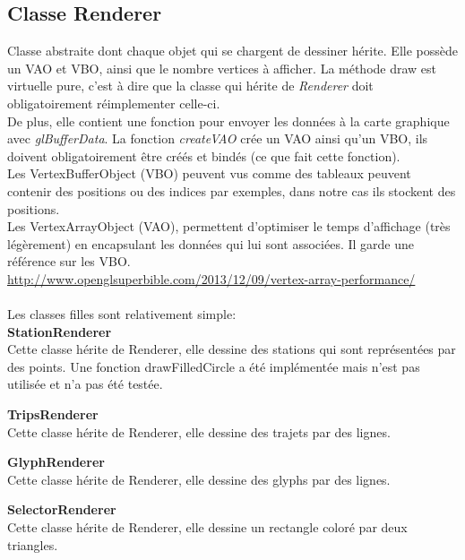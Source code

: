 \documentclass[12pt]{article}
\begin{document}
		\subsection{Classe Renderer}
		Classe abstraite dont chaque objet qui se chargent de dessiner hérite. Elle possède un VAO et VBO, ainsi que le nombre vertices à afficher. La méthode draw est virtuelle pure, c’est à dire que la classe qui hérite de \textit{Renderer} doit obligatoirement réimplementer celle-ci.\\

		De plus, elle contient une fonction pour envoyer les données à la carte graphique avec \textit{glBufferData}. La fonction \textit{createVAO} crée un VAO ainsi qu’un VBO, ils doivent obligatoirement être créés et bindés (ce que fait cette fonction).\\

		Les VertexBufferObject (VBO) peuvent vus comme des tableaux peuvent contenir des positions ou des indices par exemples, dans notre cas ils stockent des positions.\\

		Les VertexArrayObject (VAO), permettent d’optimiser le temps d’affichage (très légèrement) en encapsulant les données qui lui sont associées. Il garde une référence sur les VBO.\\

		\url{http://www.openglsuperbible.com/2013/12/09/vertex-array-performance/}\\ \\
		
		Les classes filles sont relativement simple:\\
		
		\textbf{StationRenderer}\\
		Cette classe hérite de Renderer, elle dessine des stations qui sont représentées par des points. Une fonction drawFilledCircle a été implémentée mais n’est pas utilisée et n’a pas été testée.
		
		\textbf{TripsRenderer}\\
		Cette classe hérite de Renderer, elle dessine des trajets par des lignes. 

		
		\textbf{GlyphRenderer}\\
		Cette classe hérite de Renderer, elle dessine des glyphs par des lignes. 

		
		\textbf{SelectorRenderer}\\
		Cette classe hérite de Renderer, elle dessine un rectangle coloré par deux triangles.
		
\end{document}
